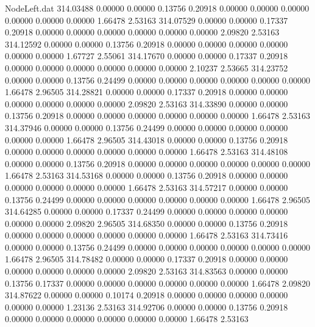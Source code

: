\begin{filecontents}{NodeLeft.dat}
 314.03488    0.00000    0.00000     0.13756    0.20918    0.00000    0.00000    0.00000    0.00000    0.00000    0.00000    1.66478    2.53163
 314.07529    0.00000    0.00000     0.17337    0.20918    0.00000    0.00000    0.00000    0.00000    0.00000    0.00000    2.09820    2.53163
 314.12592    0.00000    0.00000     0.13756    0.20918    0.00000    0.00000    0.00000    0.00000    0.00000    0.00000    1.67727    2.55061
 314.17670    0.00000    0.00000     0.17337    0.20918    0.00000    0.00000    0.00000    0.00000    0.00000    0.00000    2.10237    2.53665
 314.23752    0.00000    0.00000     0.13756    0.24499    0.00000    0.00000    0.00000    0.00000    0.00000    0.00000    1.66478    2.96505
 314.28821    0.00000    0.00000     0.17337    0.20918    0.00000    0.00000    0.00000    0.00000    0.00000    0.00000    2.09820    2.53163
 314.33890    0.00000    0.00000     0.13756    0.20918    0.00000    0.00000    0.00000    0.00000    0.00000    0.00000    1.66478    2.53163
 314.37946    0.00000    0.00000     0.13756    0.24499    0.00000    0.00000    0.00000    0.00000    0.00000    0.00000    1.66478    2.96505
 314.43018    0.00000    0.00000     0.13756    0.20918    0.00000    0.00000    0.00000    0.00000    0.00000    0.00000    1.66478    2.53163
 314.48108    0.00000    0.00000     0.13756    0.20918    0.00000    0.00000    0.00000    0.00000    0.00000    0.00000    1.66478    2.53163
 314.53168    0.00000    0.00000     0.13756    0.20918    0.00000    0.00000    0.00000    0.00000    0.00000    0.00000    1.66478    2.53163
 314.57217    0.00000    0.00000     0.13756    0.24499    0.00000    0.00000    0.00000    0.00000    0.00000    0.00000    1.66478    2.96505
 314.64285    0.00000    0.00000     0.17337    0.24499    0.00000    0.00000    0.00000    0.00000    0.00000    0.00000    2.09820    2.96505
 314.68350    0.00000    0.00000     0.13756    0.20918    0.00000    0.00000    0.00000    0.00000    0.00000    0.00000    1.66478    2.53163
 314.73416    0.00000    0.00000     0.13756    0.24499    0.00000    0.00000    0.00000    0.00000    0.00000    0.00000    1.66478    2.96505
 314.78482    0.00000    0.00000     0.17337    0.20918    0.00000    0.00000    0.00000    0.00000    0.00000    0.00000    2.09820    2.53163
 314.83563    0.00000    0.00000     0.13756    0.17337    0.00000    0.00000    0.00000    0.00000    0.00000    0.00000    1.66478    2.09820
 314.87622    0.00000    0.00000     0.10174    0.20918    0.00000    0.00000    0.00000    0.00000    0.00000    0.00000    1.23136    2.53163
 314.92706    0.00000    0.00000     0.13756    0.20918    0.00000    0.00000    0.00000    0.00000    0.00000    0.00000    1.66478    2.53163

\end{filecontents}
